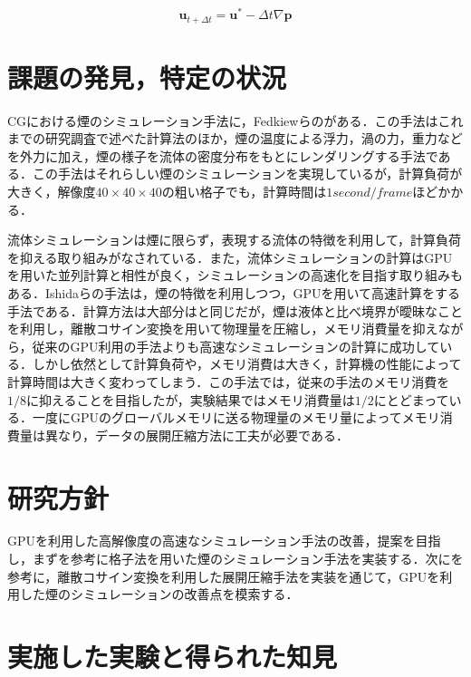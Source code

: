 \documentclass[10pt,a4paper,notitlepage,oneside,twocolumn]{abst_jsarticle}
\begin{document}
\begin{equation}\label{eq:colin_v}
\bm{u}_{t+\Delta t} = \bm{u}^* - \Delta t \nabla \bm{p}
\end{equation} 

\section{課題の発見，特定の状況}
CGにおける煙のシミュレーション手法に，Fedkiewらの\cite{fedkiew}がある．この手法はこれまでの研究調査で述べた計算法のほか，煙の温度による浮力，渦の力，重力などを外力に加え，煙の様子を流体の密度分布をもとにレンダリングする手法である．この手法はそれらしい煙のシミュレーションを実現しているが，計算負荷が大きく，解像度$40\times40\times40$の粗い格子でも，計算時間は$1 second / frame$ほどかかる．

流体シミュレーションは煙に限らず，表現する流体の特徴を利用して，計算負荷を抑える取り組みがなされている．また，流体シミュレーションの計算はGPUを用いた並列計算と相性が良く，シミュレーションの高速化を目指す取り組みもある．Ishidaらの手法\cite{GPU}は，煙の特徴を利用しつつ，GPUを用いて高速計算をする手法である．計算方法は大部分は\cite{fedkiew}と同じだが，煙は液体と比べ境界が曖昧なことを利用し，離散コサイン変換を用いて物理量を圧縮し，メモリ消費量を抑えながら，従来のGPU利用の手法よりも高速なシミュレーションの計算に成功している．しかし依然として計算負荷や，メモリ消費は大きく，計算機の性能によって計算時間は大きく変わってしまう．この手法では，従来の手法のメモリ消費を$1/8$に抑えることを目指したが，実験結果ではメモリ消費量は$1/2$にとどまっている．一度にGPUのグローバルメモリに送る物理量のメモリ量によってメモリ消費量は異なり，データの展開圧縮方法に工夫が必要である．

\section{研究方針}
GPUを利用した高解像度の高速なシミュレーション手法の改善，提案を目指し，まず\cite{fedkiew}を参考に格子法を用いた煙のシミュレーション手法を実装する．次に\cite{GPU}を参考に，離散コサイン変換を利用した展開圧縮手法を実装を通じて，GPUを利用した煙のシミュレーションの改善点を模索する．

\section{実施した実験と得られた知見}
 
\end{document}
